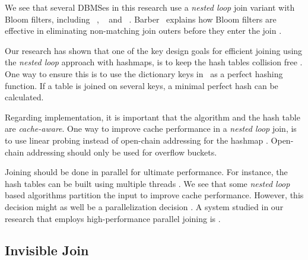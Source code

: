 We see that several DBMSes in this research use a \textit{nested loop} join variant with Bloom filters, including \oracle~\cite{Lahiri2015-mz}, \ibm~\cite{Raman2013-em} and \blink~\cite{Raman2008-gi}. Barber \ea~explains how Bloom filters are effective in eliminating non-matching join outers before they enter the join \cite{Barber2014-ey}.

Our research has shown that one of the key design goals for efficient joining using the \textit{nested loop} approach with hashmaps, is to keep the hash tables collision free \cite{Raman2008-gi, Raman2013-em}. One way to ensure this is to use the dictionary keys in \de~as a perfect hashing function. If a table is joined on several keys, a minimal perfect hash can be calculated.

Regarding implementation, it is important that the algorithm and the hash table are \textit{cache-aware}. One way to improve cache performance in a \textit{nested loop} join, is to use linear probing instead of open-chain addressing for the hashmap \cite{Raman2008-gi}. Open-chain addressing should only be used for overflow buckets.

Joining should be done in parallel for ultimate performance. For instance, the hash tables can be built using multiple threads \cite{Barber2014-ey}. We see that some \textit{nested loop} based algorithms partition the input to improve cache performance. However, this decision might as well be a parallelization decision \cite{Neumann2011-uq}. A system studied in our research that employs high-performance parallel joining is \ibm \cite{Raman2013-em}.

\subsection{Invisible Join}
\label{sub:Invisible Join}

